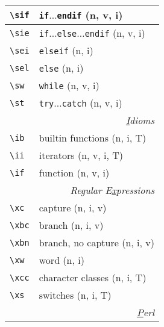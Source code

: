 \documentclass[oneside,10pt,landscape,DIV16]{scrartcl}
\begin{document}
\begin{multicols}{3}
\begin{center}
\begin{tabular}[]{|p{11mm}|p{58mm}|}
\hline \verb'\sif'    & \verb'if'$\ldots$\verb'endif'                    \hfill (n, v, i)\\
\hline \verb'\sie'    & \verb'if'$\ldots$\verb'else'$\ldots$\verb'endif' \hfill (n, v, i)\\
\hline \verb'\sei'    & \verb'elseif'                                    \hfill (n, i)\\
\hline \verb'\sel'    & \verb'else'                                      \hfill (n, i)\\
\hline \verb'\sw'     & \verb'while'                                     \hfill (n, v, i)\\
\hline \verb'\st'     & \verb'try'$\ldots$\verb'catch'                   \hfill (n, v, i)\\
\hline
\hline
\multicolumn{2}{|r|}{\textsl{\underline{I}dioms}}                 \\[1.0ex]
\hline \verb'\ib' & builtin functions         \hfill (n, i, T)\\
\hline \verb'\ii' & iterators                 \hfill (n, v, i, T)\\
\hline \verb'\if' & function                  \hfill (n, v, i)\\
\hline
\hline
\multicolumn{2}{|r|}{\textsl{Regular E\underline{x}pressions}}     \\[1.0ex]
\hline \verb'\xc'  & capture                 \hfill (n, i, v)\\
\hline \verb'\xbc' & branch                  \hfill (n, i, v)\\
\hline \verb'\xbn' & branch, no capture      \hfill (n, i, v)\\
\hline \verb'\xw'  & word                    \hfill (n, i)\\
\hline \verb'\xcc' & character classes       \hfill (n, i, T)\\
\hline \verb'\xs'  & switches                \hfill (n, i, T)\\
\hline
\hline
\multicolumn{2}{|r|}{\textsl{\underline{P}erl}}                       \\[1.0ex]

\end{tabular}
\end{center}
\end{multicols}
\end{document}
